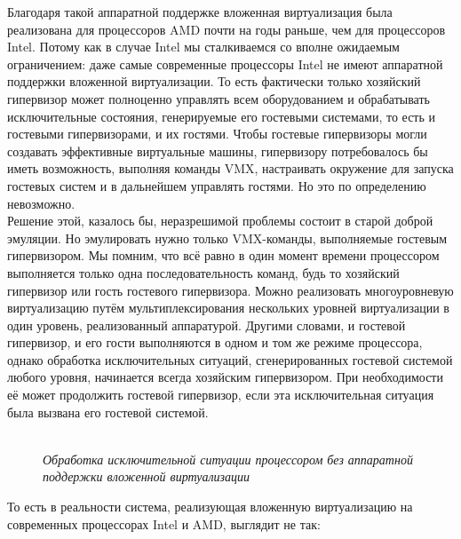 \documentclass[14pt, a4paper]{article}
\begin{document}
Благодаря такой аппаратной поддержке вложенная виртуализация была реализована для
процессоров AMD почти на годы раньше, чем для процессоров Intel. Потому как в случае Intel мы
сталкиваемся со вполне ожидаемым ограничением: даже самые современные процессоры Intel не
имеют аппаратной поддержки вложенной виртуализации. То есть фактически только хозяйский
гипервизор может полноценно управлять всем оборудованием и обрабатывать исключительные
состояния, генерируемые его гостевыми системами, то есть и гостевыми гипервизорами, и их гостями.
Чтобы гостевые гипервизоры могли создавать эффективные виртуальные машины, гипервизору
потребовалось бы иметь возможность, выполняя команды VMX, настраивать окружение для запуска
гостевых систем и в дальнейшем управлять гостями. Но это по определению невозможно.\\

Решение этой, казалось бы, неразрешимой проблемы состоит в старой доброй эмуляции. Но
эмулировать нужно только VMX-команды, выполняемые гостевым гипервизором. Мы помним, что всё
равно в один момент времени процессором выполняется только одна последовательность команд,
будь то хозяйский гипервизор или гость гостевого гипервизора. Можно реализовать многоуровневую
виртуализацию путём мультиплексирования нескольких уровней виртуализации в один уровень,
реализованный аппаратурой. Другими словами, и гостевой гипервизор, и его гости выполняются в
одном и том же режиме процессора, однако обработка исключительных ситуаций, сгенерированных
гостевой системой любого уровня, начинается всегда хозяйским гипервизором. При необходимости её
может продолжить гостевой гипервизор, если эта исключительная ситуация была вызвана его
гостевой системой.\\

\begin{figure}[h]
    \centering
    \\
    \small\textit{Обработка исключительной ситуации процессором без аппаратной поддержки вложенной виртуализации}
    \label{framework} 
\end{figure}

То есть в реальности система, реализующая вложенную виртуализацию на современных процессорах
Intel и AMD, выглядит не так:

\newpage

\begin{figure}[h]
    \label{framework} 
\end{figure}
\end{document}
